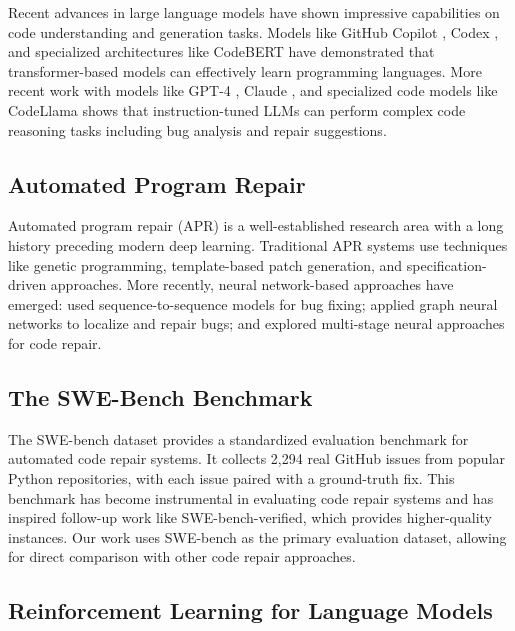 \documentclass{article} %
\begin{document}
Recent advances in large language models have shown impressive capabilities on code understanding and generation tasks. Models like GitHub Copilot \citep{chen2021evaluating}, Codex \citep{chen2021evaluating}, and specialized architectures like CodeBERT \citep{feng2020codebert} have demonstrated that transformer-based models can effectively learn programming languages. More recent work with models like GPT-4 \citep{openai2023gpt4}, Claude \citep{anthropic2023claude}, and specialized code models like CodeLlama \citep{roziere2023code} shows that instruction-tuned LLMs can perform complex code reasoning tasks including bug analysis and repair suggestions.

\subsection{Automated Program Repair}

Automated program repair (APR) is a well-established research area with a long history preceding modern deep learning. Traditional APR systems \citep{monperrus2018automatic} use techniques like genetic programming, template-based patch generation, and specification-driven approaches. More recently, neural network-based approaches have emerged: \citet{tufano2019learning} used sequence-to-sequence models for bug fixing; \citet{bader2019getafix} applied graph neural networks to localize and repair bugs; and \citet{ye2021neural} explored multi-stage neural approaches for code repair.

\subsection{The SWE-Bench Benchmark}

The SWE-bench dataset \citep{jimenez2023swebench} provides a standardized evaluation benchmark for automated code repair systems. It collects 2,294 real GitHub issues from popular Python repositories, with each issue paired with a ground-truth fix. This benchmark has become instrumental in evaluating code repair systems and has inspired follow-up work like SWE-bench-verified, which provides higher-quality instances. Our work uses SWE-bench as the primary evaluation dataset, allowing for direct comparison with other code repair approaches.

\subsection{Reinforcement Learning for Language Models}
\end{document}

